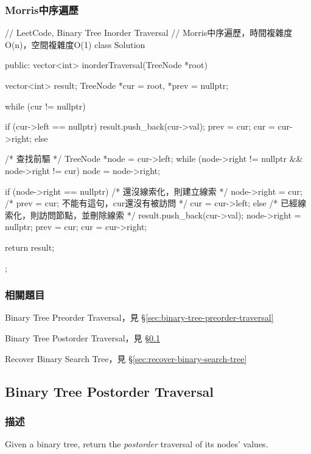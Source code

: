 \subsubsection{Morris中序遍歷}
\begin{Code}
// LeetCode, Binary Tree Inorder Traversal
// Morris中序遍歷，時間複雜度O(n)，空間複雜度O(1)
class Solution {
public:
    vector<int> inorderTraversal(TreeNode *root) {
        vector<int> result;
        TreeNode *cur = root, *prev = nullptr;

        while (cur != nullptr) {
            if (cur->left == nullptr) {
                result.push_back(cur->val);
                prev = cur;
                cur = cur->right;
            } else {
                /* 查找前驅 */
                TreeNode *node = cur->left;
                while (node->right != nullptr && node->right != cur)
                    node = node->right;

                if (node->right == nullptr) { /* 還沒線索化，則建立線索 */
                    node->right = cur;
                    /* prev = cur; 不能有這句，cur還沒有被訪問 */
                    cur = cur->left;
                } else {    /* 已經線索化，則訪問節點，並刪除線索  */
                    result.push_back(cur->val);
                    node->right = nullptr;
                    prev = cur;
                    cur = cur->right;
                }
            }
        }
        return result;
    }
};
\end{Code}


\subsubsection{相關題目}
\begindot
\item Binary Tree Preorder Traversal，見 \S \ref{sec:binary-tree-preorder-traversal}
\item Binary Tree Postorder Traversal，見 \S \ref{sec:binary-tree-postorder-traversal}
\item Recover Binary Search Tree，見 \S \ref{sec:recover-binary-search-tree}
\myenddot


\subsection{Binary Tree Postorder Traversal}
\label{sec:binary-tree-postorder-traversal}


\subsubsection{描述}
Given a binary tree, return the \emph{postorder} traversal of its nodes' values.

